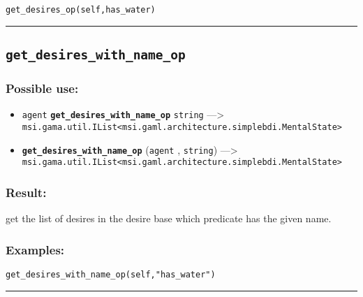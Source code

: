 \documentclass[]{book}
\providecommand{\tightlist}{%
  \setlength{\itemsep}{0pt}\setlength{\parskip}{0pt}}
\theoremstyle{definition}
\theoremstyle{definition}
\theoremstyle{definition}
\theoremstyle{remark}
\begin{document}
\begin{verbatim}
get_desires_op(self,has_water) 
\end{verbatim}

\begin{center}\rule{0.5\linewidth}{\linethickness}\end{center}

\subsection{\texorpdfstring{\texttt{get\_desires\_with\_name\_op}}{get\_desires\_with\_name\_op}}\label{get_desires_with_name_op}

\subsubsection{Possible use:}\label{possible-use-206}

\begin{itemize}
\tightlist
\item
  \texttt{agent} \textbf{\texttt{get\_desires\_with\_name\_op}}
  \texttt{string} ---\textgreater{}
  \texttt{msi.gama.util.IList\textless{}msi.gaml.architecture.simplebdi.MentalState\textgreater{}}
\item
  \textbf{\texttt{get\_desires\_with\_name\_op}} (\texttt{agent} ,
  \texttt{string}) ---\textgreater{}
  \texttt{msi.gama.util.IList\textless{}msi.gaml.architecture.simplebdi.MentalState\textgreater{}}
\end{itemize}

\subsubsection{Result:}\label{result-200}

get the list of desires in the desire base which predicate has the given
name.

\subsubsection{Examples:}\label{examples-153}

\begin{verbatim}
get_desires_with_name_op(self,"has_water") 
\end{verbatim}

\begin{center}\rule{0.5\linewidth}{\linethickness}\end{center}
\end{document}
